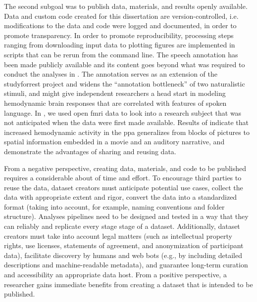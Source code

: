 
%

%
The second subgoal was to publish data, materials, and results openly available.
%
Data and custom code created for this dissertation are version-controlled, i.e.
modifications to the data and code were logged and documented, in order to
promote transparency.
%
In order to promote reproducibility, processing steps ranging from downloading
input data to plotting figures are implemented in scripts that can be rerun from
the command line.
%
The speech annotation has been made publicly available
\citep{haeusler2021speechanno} and its content goes beyond what was required to
conduct the analyses in \citet{haeusler2022processing}.
%
The annotation serves as an extension of the studyforrest project and widens the
``annotation bottleneck'' \citep[][p.  16]{aliko2020naturalistic} of two
naturalistic stimuli, and might give independent researchers a head start in
modeling hemodynamic brain responses that are correlated with features of spoken
language.
%
In \citet{haeusler2022processing}, we used open \ac{fmri} data to look into a
research subject that was not anticipated when the data were first made
available.
%
Results of \citet{haeusler2022processing} indicate that increased hemodynamic
activity in the \ac{ppa} generalizes from blocks of pictures to spatial
information embedded in a movie and an auditory narrative, and demonstrate the
advantages of sharing and reusing data.

From a negative perspective, creating data, materials, and code to be published
requires a considerable about of time and effort.
%
To encourage third parties to reuse the data, dataset creators must anticipate
potential use cases, collect the data with appropriate extent and rigor, convert
the data into a standardized format (taking into account, for example, naming
conventions and folder structure).
Analyses pipelines need to be designed and tested in a way that they can
reliably and replicate every stage stage of a dataset.
Additionally, dataset creators must take into account legal matters (such as
intellectual property rights, use licenses, statements of agreement, and
anonymization of participant data), facilitate discovery by humans and web bots
(e.g., by including detailed descriptions and machine-readable metadata), and
guarantee long-term curation and accessibility an appropriate data host.
%
From a positive perspective, a researcher gains immediate benefits from creating
a dataset that is intended to be published.


